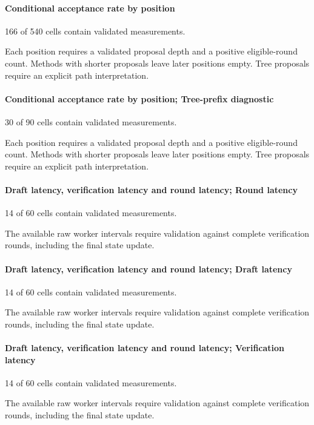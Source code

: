 \paragraph*{Conditional acceptance rate by position}

166 of 540 cells contain validated measurements.

Each position requires a validated proposal depth and a positive eligible-round count. Methods with shorter proposals leave later positions empty. Tree proposals require an explicit path interpretation.

\paragraph*{Conditional acceptance rate by position; Tree-prefix diagnostic}

30 of 90 cells contain validated measurements.

Each position requires a validated proposal depth and a positive eligible-round count. Methods with shorter proposals leave later positions empty. Tree proposals require an explicit path interpretation.

\paragraph*{Draft latency, verification latency and round latency; Round latency}

14 of 60 cells contain validated measurements.

The available raw worker intervals require validation against complete verification rounds, including the final state update.

\paragraph*{Draft latency, verification latency and round latency; Draft latency}

14 of 60 cells contain validated measurements.

The available raw worker intervals require validation against complete verification rounds, including the final state update.

\paragraph*{Draft latency, verification latency and round latency; Verification latency}

14 of 60 cells contain validated measurements.

The available raw worker intervals require validation against complete verification rounds, including the final state update.